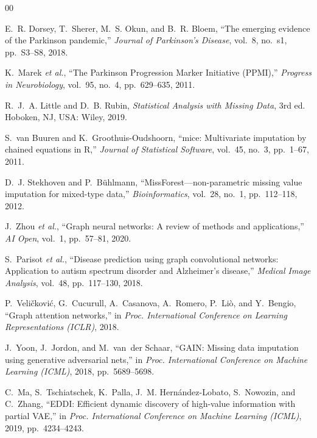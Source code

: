 \documentclass[journal,twoside,web]{ieeecolor}
\begin{document}
\begin{thebibliography}{00}

E.~R. Dorsey, T.~Sherer, M.~S. Okun, and B.~R. Bloem, ``The emerging evidence of the Parkinson pandemic,'' \textit{Journal of Parkinson's Disease}, vol.~8, no.~s1, pp.~S3--S8, 2018.

K.~Marek \textit{et al.}, ``The Parkinson Progression Marker Initiative (PPMI),'' \textit{Progress in Neurobiology}, vol.~95, no.~4, pp.~629--635, 2011.

R.~J.~A. Little and D.~B. Rubin, \textit{Statistical Analysis with Missing Data}, 3rd ed. Hoboken, NJ, USA: Wiley, 2019.

S.~van Buuren and K.~Groothuis-Oudshoorn, ``mice: Multivariate imputation by chained equations in {R},'' \textit{Journal of Statistical Software}, vol.~45, no.~3, pp.~1--67, 2011.

D.~J. Stekhoven and P.~B{\"u}hlmann, ``MissForest---non-parametric missing value imputation for mixed-type data,'' \textit{Bioinformatics}, vol.~28, no.~1, pp.~112--118, 2012.

J.~Zhou \textit{et al.}, ``Graph neural networks: A review of methods and applications,'' \textit{AI Open}, vol.~1, pp.~57--81, 2020.

S.~Parisot \textit{et al.}, ``Disease prediction using graph convolutional networks: Application to autism spectrum disorder and {A}lzheimer's disease,'' \textit{Medical Image Analysis}, vol.~48, pp.~117--130, 2018.

P.~Veli{\v{c}}kovi{\'c}, G.~Cucurull, A.~Casanova, A.~Romero, P.~Li{\`o}, and Y.~Bengio, ``Graph attention networks,'' in \textit{Proc. International Conference on Learning Representations (ICLR)}, 2018.

J.~Yoon, J.~Jordon, and M.~van~der Schaar, ``{GAIN}: Missing data imputation using generative adversarial nets,'' in \textit{Proc. International Conference on Machine Learning (ICML)}, 2018, pp.~5689--5698.

C.~Ma, S.~Tschiatschek, K.~Palla, J.~M. Hern{\'a}ndez-Lobato, S.~Nowozin, and C.~Zhang, ``{EDDI}: Efficient dynamic discovery of high-value information with partial {VAE},'' in \textit{Proc. International Conference on Machine Learning (ICML)}, 2019, pp.~4234--4243.


\end{thebibliography}
\end{document}
